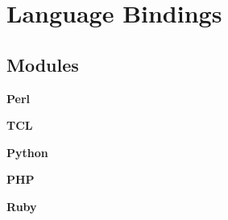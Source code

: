 \section{Language Bindings}
\label{group__GLUE}
\subsection*{Modules}
\begin{CompactItemize}
\item 
{\bf Perl}
\item 
{\bf TCL}
\item 
{\bf Python}
\item 
{\bf PHP}
\item 
{\bf Ruby}
\end{CompactItemize}
